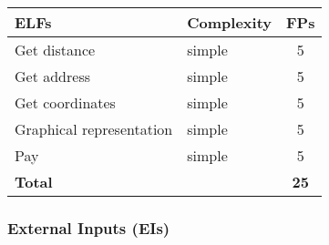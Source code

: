 \begin{center}
	
	\begin{tabular}{|l|l|c|}
		\hline
		\textbf{ELFs} 	& \textbf{Complexity} 	& \textbf{FPs} \\
		\hline
		Get distance 	& simple 	& 5 \\
		Get address 	& simple 	& 5 \\
		Get coordinates 	& simple 	& 5 \\
		Graphical representation  	& simple 	& 5 \\
		Pay 	& simple 	& 5 \\
		\hline \hline
		\textbf{Total} 	& 	& \textbf{25} \\
		\hline
	\end{tabular}
\end{center}


\subsubsection{External Inputs (EIs)}

